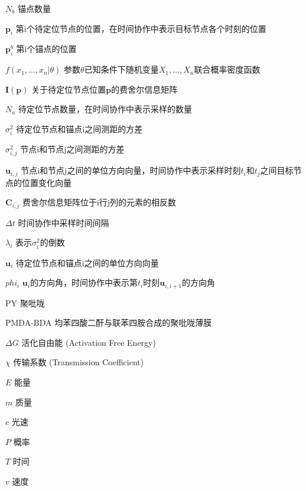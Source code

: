 \begin{denotation}[3cm]
\item[$N_b$] 锚点数量
\item[$\bm{p}_i$] 第i个待定位节点的位置，在时间协作中表示目标节点各个时刻的位置
\item[$\bm{p}^b_i$] 第i个锚点的位置
\item[$f(x_1,\dots,x_n|\theta)$] 参数$\theta$已知条件下随机变量$X_1,\dots,X_n$联合概率密度函数
\item[$\bm{I}(\bm{p})$] 关于待定位节点位置$\bm{p}$的费舍尔信息矩阵
\item[$N_a$] 待定位节点数量，在时间协作中表示采样的数量
\item[$\sigma^2_{i}$] 待定位节点和锚点i之间测距的方差
\item[$\sigma^2_{i,j}$] 节点i和节点j之间测距的方差
\item[$\bm{u}_{i,j}$] 节点i和节点j之间的单位方向向量，时间协作中表示采样时刻$t_i$和$t_j$之间目标节点的位置变化向量
\item[$\bm{C}_{i,j}$] 费舍尔信息矩阵位于i行j列的元素的相反数
\item[$\Delta t$] 时间协作中采样时间间隔
\item[$\lambda_{i}$] 表示$\sigma^2_{i}$的倒数
\item[$\bm{u}_i$] 待定位节点和锚点i之间的单位方向向量
\item[$phi_i$] $\bm{u}_i$的方向角，时间协作中表示第$t_i$时刻$\bm{u}_{i,i+1}$的方向角
\item[PY] 聚吡咙
\item[PMDA-BDA]	均苯四酸二酐与联苯四胺合成的聚吡咙薄膜
\item[$\Delta G$] 活化自由能 (Activation Free Energy)
\item[$\chi$] 传输系数 (Transmission Coefficient)
\item[$E$] 能量
\item[$m$] 质量
\item[$c$] 光速
\item[$P$] 概率
\item[$T$] 时间
\item[$v$] 速度

\end{denotation}
